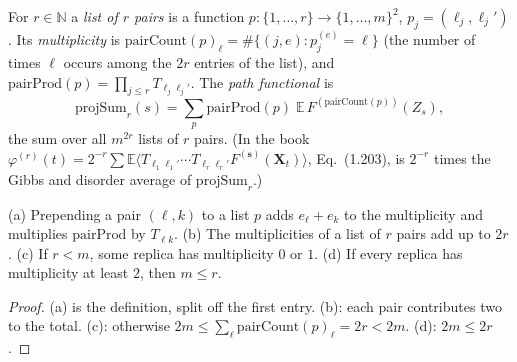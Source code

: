 \begin{definition}
\label{def:sg-tal:projsum}
  \leanok
{}
For $r\in\mathbb N$ a \emph{list of $r$ pairs} is a function $p:\{1,\dots,r\}\to\{1,\dots,m\}^2$, $p_j=(\ell_j,\ell_j')$.
Its \emph{multiplicity} is $\mathrm{pairCount}(p)_\ell=\#\{(j,e):p_j^{(e)}=\ell\}$ (the number of times $\ell$ occurs among the $2r$ entries of the list),
and $\mathrm{pairProd}(p)=\prod_{j\le r}T_{\ell_j\ell_j'}$.  The \emph{path functional} is
\[
\mathrm{projSum}_r(s)=\sum_{p}\mathrm{pairProd}(p)\;\mathbb E\,F^{(\mathrm{pairCount}(p))}(Z_s),
\]
the sum over all $m^{2r}$ lists of $r$ pairs.  (In the book $\varphi^{(r)}(t)=2^{-r}\sum\mathbb E\langle T_{\ell_1\ell_1'}\cdots T_{\ell_r\ell_r'}F^{(\mathbf s)}(\mathbf X_t)\rangle$, Eq.~(1.203), is $2^{-r}$ times the Gibbs and disorder average of $\mathrm{projSum}_r$.)
\end{definition}

\begin{lemma}
\label{lem:sg-tal:paircount}
  \leanok
{}
(a) Prepending a pair $(\ell,k)$ to a list $p$ adds $e_\ell+e_k$ to the multiplicity and multiplies $\mathrm{pairProd}$ by $T_{\ell k}$.
(b) The multiplicities of a list of $r$ pairs add up to $2r$.
(c) If $r<m$, some replica has multiplicity $0$ or $1$.
(d) If every replica has multiplicity at least $2$, then $m\le r$.
\end{lemma}
\begin{proof}
  \leanok
(a) is the definition, split off the first entry.  (b): each pair contributes two to the total.  (c): otherwise $2m\le\sum_\ell\mathrm{pairCount}(p)_\ell=2r<2m$.  (d): $2m\le2r$.
\end{proof}

